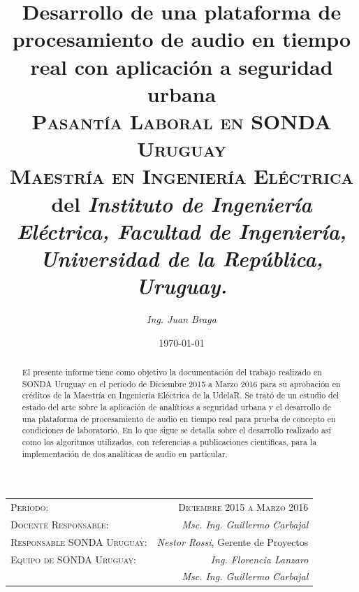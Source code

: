 \documentclass{article}
\title{\textbf{Desarrollo de una plataforma de procesamiento de audio en tiempo real con aplicación a seguridad urbana}\\ \textsc{Pasantía Laboral en SONDA Uruguay}\\
\large \textsc{Maestría en Ingeniería Eléctrica} del \textit{Instituto de Ingeniería Eléctrica, Facultad de Ingeniería, Universidad de la República, Uruguay.}}
\author{\textit{Ing. Juan Braga}}
\date{\today}
\begin{document}
\maketitle 

\begin{center}
\begin{tabular}{l r}
\medskip
\textsc{Período:} & \textsc{Diciembre 2015 a Marzo 2016}\\ %
\textsc{Docente Responsable:} & \textit{Msc. Ing. Guillermo Carbajal} \\ 
\textsc{Responsable SONDA Uruguay:} & \textit{Nestor Rossi}, Gerente de Proyectos  \\
\textsc{Equipo de SONDA Uruguay:} & \textit{Ing. Florencia Lanzaro} \\ & \textit{Msc. Ing. Guillermo Carbajal} \\ 
\end{tabular}
\end{center}


\begin{abstract}
El presente informe tiene como objetivo la documentación del trabajo realizado en SONDA Uruguay en el período de Diciembre 2015 a Marzo 2016 para su aprobación en créditos de la Maestría en Ingeniería Eléctrica de la UdelaR. Se trató de un estudio del estado del arte sobre la aplicación de analíticas a seguridad urbana y el desarrollo de una plataforma de procesamiento de audio en tiempo real para prueba de concepto en condiciones de laboratorio. En lo que sigue se detalla sobre el desarrollo realizado así como los algoritmos utilizados, con referencias a publicaciones científicas, para la implementación de dos analíticas de audio en particular. 
\end{abstract}

\end{document}
